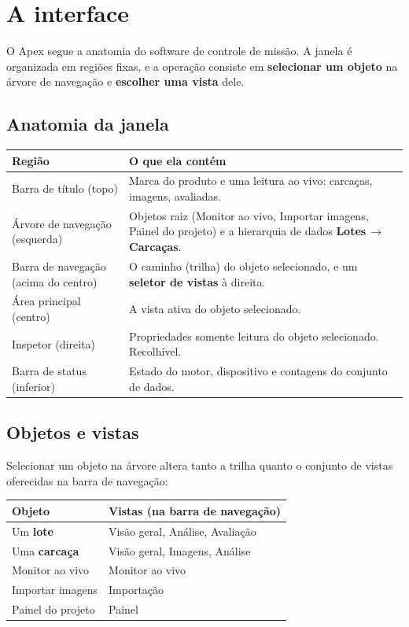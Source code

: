 \chapter{A interface}


\vspace{4pt}
O Apex segue a anatomia do software de controle de missão. A janela é organizada em
regiões fixas, e a operação consiste em \textbf{selecionar um objeto} na árvore de
navegação e \textbf{escolher uma vista} dele.

\section{Anatomia da janela}

\begin{center}
\begin{tabularx}{\linewidth}{@{}l X@{}}
\toprule
\textbf{Região} & \textbf{O que ela contém} \\
\midrule
Barra de título (topo) & Marca do produto e uma leitura ao vivo: carcaças, imagens, avaliadas. \\
Árvore de navegação (esquerda) & Objetos raiz (Monitor ao vivo, Importar imagens, Painel do projeto) e a hierarquia de dados \textbf{Lotes\,$\rightarrow$\,Carcaças}. \\
Barra de navegação (acima do centro) & O caminho (trilha) do objeto selecionado, e um \textbf{seletor de vistas} à direita. \\
Área principal (centro) & A vista ativa do objeto selecionado. \\
Inspetor (direita) & Propriedades somente leitura do objeto selecionado. Recolhível. \\
Barra de status (inferior) & Estado do motor, dispositivo e contagens do conjunto de dados. \\
\bottomrule
\end{tabularx}
\end{center}

\section{Objetos e vistas}

Selecionar um objeto na árvore altera tanto a trilha quanto o conjunto de vistas
oferecidas na barra de navegação:

\begin{center}
\begin{tabularx}{\linewidth}{@{}l X@{}}
\toprule
\textbf{Objeto} & \textbf{Vistas (na barra de navegação)} \\
\midrule
Um \textbf{lote}      & Visão geral, Análise, Avaliação \\
Uma \textbf{carcaça}  & Visão geral, Imagens, Análise \\
Monitor ao vivo       & Monitor ao vivo \\
Importar imagens      & Importação \\
Painel do projeto     & Painel \\
\bottomrule
\end{tabularx}
\end{center}

